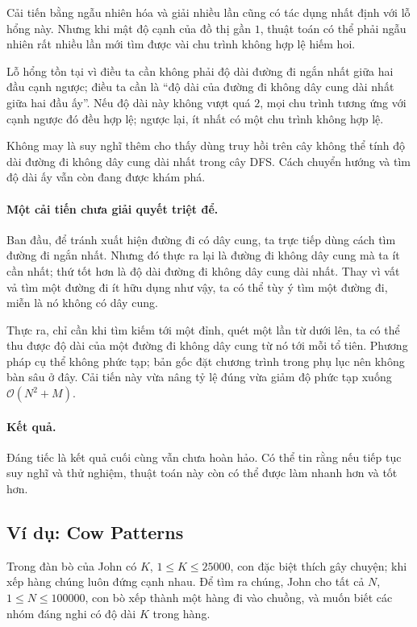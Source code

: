 \documentclass[11pt]{article}
\newcommand{\Oh}{\mathcal{O}}
\begin{document}
Cải tiến bằng ngẫu nhiên hóa và giải nhiều lần cũng có tác dụng nhất định với
lỗ hổng này. Nhưng khi mật độ cạnh của đồ thị gần \(1\), thuật toán có thể
phải ngẫu nhiên rất nhiều lần mới tìm được vài chu trình không hợp lệ hiếm hoi.

Lỗ hổng tồn tại vì điều ta cần không phải độ dài đường đi ngắn nhất giữa hai
đầu cạnh ngược; điều ta cần là ``độ dài của đường đi không dây cung dài nhất
giữa hai đầu ấy''. Nếu độ dài này không vượt quá \(2\), mọi chu trình tương
ứng với cạnh ngược đó đều hợp lệ; ngược lại, ít nhất có một chu trình không
hợp lệ.

Không may là suy nghĩ thêm cho thấy dùng truy hồi trên cây không thể tính độ
dài đường đi không dây cung dài nhất trong cây DFS. Cách chuyển hướng và tìm
độ dài ấy vẫn còn đang được khám phá.

\paragraph{Một cải tiến chưa giải quyết triệt để.}
Ban đầu, để tránh xuất hiện đường đi có dây cung, ta trực tiếp dùng cách tìm
đường đi ngắn nhất. Nhưng đó thực ra lại là đường đi không dây cung mà ta ít
cần nhất; thứ tốt hơn là độ dài đường đi không dây cung dài nhất. Thay vì vất
vả tìm một đường đi ít hữu dụng như vậy, ta có thể tùy ý tìm một đường đi,
miễn là nó không có dây cung.

Thực ra, chỉ cần khi tìm kiếm tới một đỉnh, quét một lần từ dưới lên, ta có
thể thu được độ dài của một đường đi không dây cung từ nó tới mỗi tổ tiên.
Phương pháp cụ thể không phức tạp; bản gốc đặt chương trình trong phụ lục nên
không bàn sâu ở đây. Cải tiến này vừa nâng tỷ lệ đúng vừa giảm độ phức tạp
xuống \(\Oh(N^2+M)\).

\paragraph{Kết quả.}
Đáng tiếc là kết quả cuối cùng vẫn chưa hoàn hảo. Có thể tin rằng nếu tiếp tục
suy nghĩ và thử nghiệm, thuật toán này còn có thể được làm nhanh hơn và tốt
hơn.

\subsection{Ví dụ: Cow Patterns}

Trong đàn bò của John có \(K\), \(1\le K\le 25000\), con đặc biệt thích gây
chuyện; khi xếp hàng chúng luôn đứng cạnh nhau. Để tìm ra chúng, John cho tất
cả \(N\), \(1\le N\le 100000\), con bò xếp thành một hàng đi vào chuồng, và
muốn biết các nhóm đáng nghi có độ dài \(K\) trong hàng.
\end{document}
